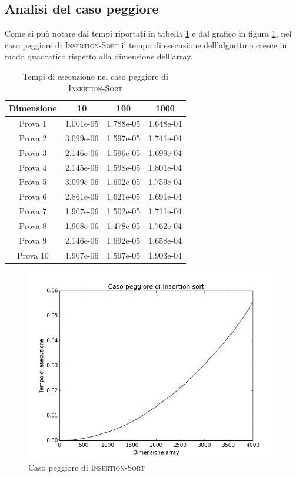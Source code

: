\documentclass[11pt]{article}
\begin{document}
\subsection{Analisi del caso peggiore}
Come si può notare dai tempi riportati in tabella \ref{t_peggiore_insertion} e dal grafico in figura \ref{peggiore_insertion}, nel caso peggiore di \textsc{Insertion-Sort} il tempo di esecuzione dell'algoritmo cresce in modo quadratico rispetto alla dimensione dell'array.
\begin{table}[h]
\centering
\begin{tabular}{|c|c|c|c|}\hline
Dimensione &10 &100 &1000\\ \hline
Prova 1	&1.001e-05 &1.788e-05 &1.648e-04 \\ \hline
Prova 2	&3.099e-06	&1.597e-05 &1.741e-04 \\ \hline
Prova 3	&2.146e-06	&1.596e-05 &1.699e-04 \\ \hline
Prova 4	&2.145e-06	&1.598e-05 &1.801e-04	 \\ \hline
Prova 5	&3.099e-06	&1.602e-05 &1.759e-04 \\ \hline
Prova 6	&2.861e-06 &1.621e-05 &1.691e-04  \\ \hline
Prova 7	&1.907e-06	&1.502e-05 &1.711e-04 \\ \hline
Prova 8	&1.908e-06	&1.478e-05 &1.762e-04	 \\ \hline
Prova 9	&2.146e-06	&1.692e-05 &1.658e-04 \\ \hline
Prova 10&1.907e-06 &1.597e-05 &1.903e-04 \\ \hline
\end{tabular}
\caption{Tempi di esecuzione nel caso peggiore di \textsc{Insertion-Sort}}
\label{t_peggiore_insertion}
\end{table}
\begin{figure}[h]
\centering
\includegraphics[scale=0.33,angle=0]{peggiore_insertion.png}
\caption{Caso peggiore di \textsc{Insertion-Sort}}
\label{peggiore_insertion}
\end{figure}
\end{document}
